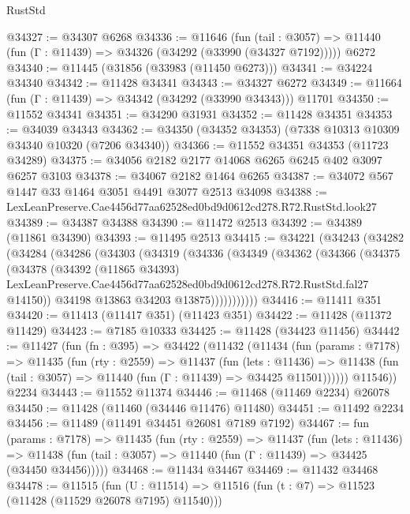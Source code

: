 \begin{lexlean}{RustStd}
\begin{coremodule}
@34327 := @34307 @6268
@34336 := @11646
    (fun (tail : @3057) => @11440 (fun (Γ : @11439) => @34326 (@34292 (@33990 (@34327 @7192)))))
    @6272
@34340 := @11445 (@31856 (@33983 (@11450 @6273)))
@34341 := @34224 @34340
@34342 := @11428 @34341
@34343 := @34327 @6272
@34349 := @11664 (fun (Γ : @11439) => @34342 (@34292 (@33990 @34343))) @11701
@34350 := @11552 @34341
@34351 := @34290 @31931
@34352 := @11428 @34351
@34353 := @34039 @34343
@34362 := @34350 (@34352 @34353) (@7338 @10313 @10309 @34340 @10320 (@7206 @34340))
@34366 := @11552 @34351 @34353 (@11723 @34289)
@34375 := @34056 @2182 @2177 @14068 @6265 @6245 @402 @3097 @6257 @3103
@34378 := @34067 @2182 @1464 @6265
@34387 := @34072 @567 @1447 @33 @1464 @3051 @4491 @3077 @2513 @34098
@34388 := LexLeanPreserve.Cae4456d77aa62528ed0bd9d0612cd278.R72.RustStd.look27
@34389 := @34387 @34388
@34390 := @11472 @2513
@34392 := @34389 (@11861 @34390)
@34393 := @11495 @2513
@34415 := @34221
    (@34243
      (@34282
        (@34284
          (@34286
            (@34303
              (@34319
                (@34336
                  (@34349
                    (@34362
                      (@34366
                        (@34375
                          (@34378
                            (@34392
                              (@11865 @34393)
                              LexLeanPreserve.Cae4456d77aa62528ed0bd9d0612cd278.R72.RustStd.fal27
                              @14150))
                          @34198
                          @13863
                          @34203
                          @13875)))))))))))
@34416 := @11411 @351
@34420 := @11413 (@11417 @351) (@11423 @351)
@34422 := @11428 (@11372 @11429)
@34423 := @7185 @10333
@34425 := @11428 (@34423 @11456)
@34442 := @11427
    (fun (fn : @395) =>
    @34422
      (@11432
        (@11434
          (fun (params : @7178) =>
          @11435
            (fun (rty : @2559) =>
            @11437
              (fun (lets : @11436) =>
              @11438 (fun (tail : @3057) => @11440 (fun (Γ : @11439) => @34425 @11501))))))
        @11546))
    @2234
@34443 := @11552 @11374
@34446 := @11468 (@11469 @2234) @26078
@34450 := @11428 (@11460 (@34446 @11476) @11480)
@34451 := @11492 @2234
@34456 := @11489 (@11491 @34451 @26081 @7189 @7192)
@34467 := fun (params : @7178) =>
  @11435
    (fun (rty : @2559) =>
    @11437
      (fun (lets : @11436) =>
      @11438 (fun (tail : @3057) => @11440 (fun (Γ : @11439) => @34425 (@34450 @34456)))))
@34468 := @11434 @34467
@34469 := @11432 @34468
@34478 := @11515
    (fun (U : @11514) => @11516 (fun (t : @7) => @11523 (@11428 (@11529 @26078 @7195) @11540)))

\end{coremodule}
\end{lexlean}
